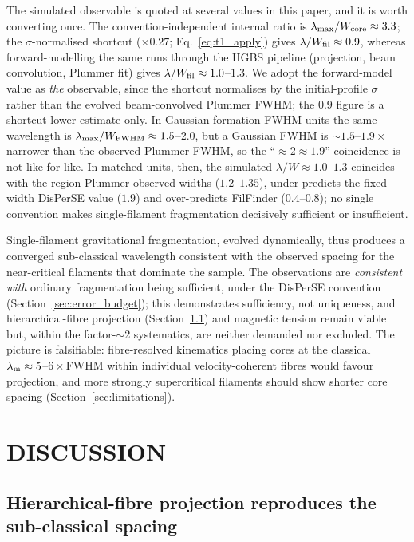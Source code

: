 \documentclass[usenatbib,twoside,twocolumn]{mnras}
\begin{document}
The simulated observable is quoted at several values in this paper, and it is worth converting once. The convention-independent internal ratio is $\lambda_{\rm max}/W_{\rm core}\approx3.3$; the $\sigma$-normalised shortcut ($\times0.27$; Eq.~\ref{eq:t1_apply}) gives $\lambda/W_{\rm fil}\approx0.9$, whereas forward-modelling the same runs through the HGBS pipeline (projection, beam convolution, Plummer fit) gives $\lambda/W_{\rm fil}\approx1.0$--$1.3$. We adopt the forward-model value as \emph{the} observable, since the shortcut normalises by the initial-profile $\sigma$ rather than the evolved beam-convolved Plummer FWHM; the $0.9$ figure is a shortcut lower estimate only. In Gaussian formation-FWHM units the same wavelength is $\lambda_{\rm max}/W_{\rm FWHM}\approx1.5$--$2.0$, but a Gaussian FWHM is $\sim1.5$--$1.9\times$ narrower than the observed Plummer FWHM, so the ``$\approx2\approx1.9$'' coincidence is not like-for-like. In matched units, then, the simulated $\lambda/W\approx1.0$--$1.3$ coincides with the region-Plummer observed widths ($1.2$--$1.35$), under-predicts the fixed-width DisPerSE value ($1.9$) and over-predicts FilFinder ($0.4$--$0.8$); no single convention makes single-filament fragmentation decisively sufficient or insufficient.

Single-filament gravitational fragmentation, evolved dynamically, thus produces a converged sub-classical wavelength consistent with the observed spacing for the near-critical filaments that dominate the sample. The observations are \emph{consistent with} ordinary fragmentation being sufficient, under the DisPerSE convention (Section~\ref{sec:error_budget}); this demonstrates sufficiency, not uniqueness, and hierarchical-fibre projection (Section~\ref{sec:fibre_projection}) and magnetic tension remain viable but, within the factor-$\sim$2 systematics, are neither demanded nor excluded. The picture is falsifiable: fibre-resolved kinematics placing cores at the classical $\lambda_{\rm m}\approx5$--$6\times$FWHM within individual velocity-coherent fibres would favour projection, and more strongly supercritical filaments should show shorter core spacing (Section~\ref{sec:limitations}).

\section{DISCUSSION}
\label{sec:discussion}

\subsection{Hierarchical-fibre projection reproduces the sub-classical spacing}
\label{sec:fibre_projection}
\end{document}
